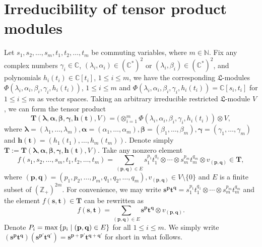 \documentclass[12pt,leqno,amscd,amsfonts,amssymb]{amsart}
\def\a{\alpha}
\def\b{\beta}
\def\r{\gamma}
\def\N{\mathbb{N}}
\def\C{\mathbb{C}}
\numberwithin{equation}{section}
\begin{document}
\section{Irreducibility of tensor product modules}
Let $s_1, s_2, \ldots, s_m, t_1, t_2, \ldots, t_m$ be commuting variables, where $m\in\N$. Fix any complex numbers $\r_i \in\C$, $(\lambda_i, \a_i)\in(\C^*)^2$ or  $(\lambda_i, \b_i)\in(\C^*)^2$, and polynomials $h_i(t_i) \in \C[t_i]$, $1\leq i \leq m$, we have the corresponding $\mathfrak L$-modules $\Phi(\lambda_i, \alpha_i, \b_i, \r_i, h_i(t_i))$, $1\leq i \leq m$ and $\Phi(\lambda_i, \alpha_i, \b_i, \r_i, h_i(t_i))=\C[s_i, t_i]$ for $1\leq i \leq m$ as vector spaces. 
Taking an arbitrary  irreducible  restricted $\mathfrak L$-module $V$, we can form the tensor product
\begin{equation}\label{a11} \bm{T}(\bm{\lambda}, \bm{\alpha}, \bm{\b}, \bm{\r}, \bm{h(t)}, V)=(\otimes_{i=1}^{m}\Phi(\lambda_i, \alpha_i, \b_i, \r_i, h_i(t_i))\otimes V,\end{equation}
where $\bm{\lambda}=(\lambda_1, \ldots, \lambda_m), \bm{\alpha}=(\alpha_1, \ldots, \alpha_m),\bm{\b}=(\b_1, \ldots, \b_m),\bm{\r}=(\r_1, \ldots, \r_m)$ and $\bm{h(t)}=(h_1(t_1), \ldots, h_m(t_m))$. Denote simply $\bm{T}:=\bm{T}(\bm{\lambda}, \bm{\alpha}, \bm{\b}, \bm{\r}, \bm{h(t)}, V)$. Take any nonzero element
\begin{equation*}f(s_1, s_2, \ldots, s_m, t_1, t_2, \ldots, t_m)=\sum_{(\mathbf{p}, \mathbf{q})\in E}s_1^{p_1}t_1^{q_1}\otimes\cdots\otimes s_m^{p_m}t_m^{q_m}\otimes v_{(\mathbf{p}, \mathbf{q})}\in\bm{T},\end{equation*}
where $(\mathbf{p}, \mathbf{q})=(p_1, p_2, \ldots, p_m, q_1, q_2, \ldots, q_m), v_{(\mathbf{p}, \mathbf{q})}\in V\setminus\{0\}$ and $E$ is a finite subset of $(\mathbb{Z}_{+})^{2m}$.  For convenience, we may write $\mathbf{s}^{\mathbf{p}}\mathbf{t}^{\mathbf{q}}=s_1^{p_1}t_1^{q_1}\otimes\cdots \otimes s_m^{p_m}t_m^{q_m}$
and the element $f(\mathbf{s}, \mathbf{t})\in \bm{T}$ can be rewritten as
\begin{equation}\label{a12}f(\mathbf{s}, \mathbf{t})=\sum_{(\mathbf{p}, \mathbf{q})\in E}\mathbf{s}^{\mathbf{p}}\mathbf{t}^{\mathbf{q}}\otimes v_{(\mathbf{p}, \mathbf{q})}.\end{equation}
Denote $P_i= {\rm max\,}\{p_i\mid (\mathbf{p}, \mathbf{q})\in E\}$ for all $1\leq i \leq m$. We simply write $(\mathbf{s}^{\mathbf{p}}\mathbf{t}^{\mathbf{q}})(\mathbf{s}^{\mathbf{p\prime}}\mathbf{t}^{\mathbf{q\prime}})=\mathbf{s}^{\mathbf{p}+\mathbf{p\prime}}\mathbf{t}^{\mathbf{q}+\mathbf{q\prime}}$ for short in what follows.
\end{document}
